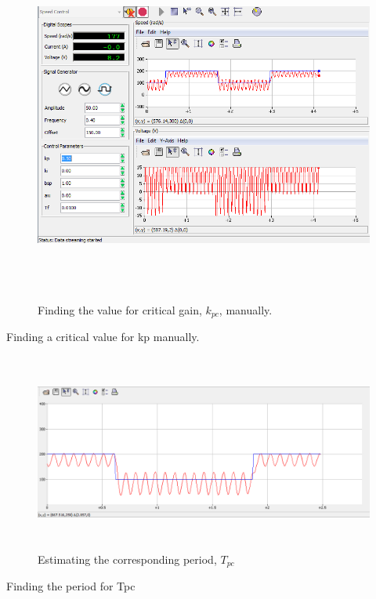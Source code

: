 \documentclass[]{article}
\begin{document}
\begin{figure}\includegraphics[width=6.50000in,height=4.62500in]{media/image30.png} \caption{Finding the value for critical gain, $k_{pc}$, manually.} \end{figure}

Finding a critical value for kp manually.

\begin{figure}\includegraphics[width=6.50000in,height=2.55556in]{media/image50.png} \caption{Estimating the corresponding period, $T_{pc}$} \end{figure}

Finding the period for Tpc
\end{document}
